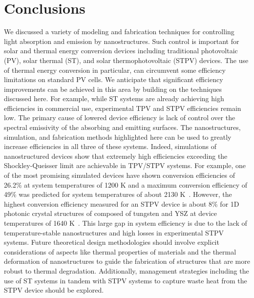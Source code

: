 \documentclass[10pt,letterpaper]{article}
\begin{document}
{\section{Conclusions}
We discussed a variety of modeling and fabrication techniques for controlling light 
absorption and emission by nanostructures.   Such control is important for solar and 
thermal energy conversion devices including traditional photovoltaic (PV), 
solar thermal (ST), and solar thermophotovoltaic (STPV) devices. 
The use of thermal energy conversion in particular, 
can circumvent some efficiency limitations on standard PV cells.  We 
anticipate that significant efficiency improvements can be achieved in this area 
by building on the techniques discussed here.  For example, while ST systems 
are already achieving high efficiencies in commercial use, experimental 
TPV and STPV efficiencies remain low.  The primary cause of lowered device 
efficiency is lack of control over the spectral emissivity of the 
absorbing and emitting surfaces.  The nanostructures, simulation, and 
fabrication methods highlighted here can be used to greatly increase 
efficiencies in all three of these systems.  
Indeed, simulations of nanostructured devices show that extremely high efficiencies 
exceeding the Shockley-Queisser limit are achievable in TPV/STPV systems.
For example, one of the most promising simulated devices have shown conversion efficiencies of 26.2\% at 
system temperatures of 1200 K and a maximum conversion efficiency of 49\% was predicted for system 
temperatures of about 2130 K~\cite{RF_OptExp_2009}.  However, the highest conversion efficiency measured
for an STPV device is about 8\% for 1D photonic crystal structures of composed of tungsten and YSZ at 
device temperatures of 1640 K~\cite{SKY_JPE_2015}.  This large gap in system efficiency is due to the lack of temperature-stable 
nanostructures and high losses in experimental STPV systems.  Future theoretical design methodologies should involve
explicit considerations of aspects like thermal properties of materials and the thermal deformation of 
nanostructures to guide the fabrication of structures that are more robust to thermal degradation.    
Additionally, management strategies including the use of ST systems in tandem with STPV systems to capture waste heat from the STPV device
should be explored.


}
\end{document}
